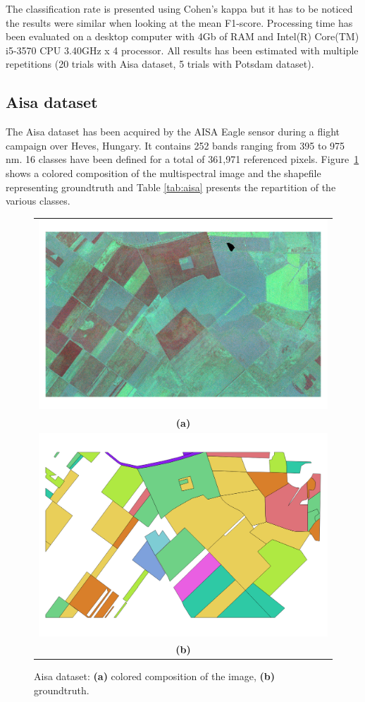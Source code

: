 \documentclass[journal,peerreview,onecolumn]{IEEEtran}
\begin{document}
    The classification rate is presented using Cohen's kappa but it has to be noticed the results were similar when looking at the mean F1-score. Processing time has been evaluated on a desktop computer with 4Gb of RAM and Intel(R) Core(TM) i5-3570 CPU \@ 3.40GHz x 4 processor. All results has been estimated with multiple repetitions (20 trials with Aisa dataset, 5 trials with Potsdam dataset).

    \subsection{Aisa dataset}
    \label{sec:aisa}
    The Aisa dataset has been acquired by the AISA Eagle sensor during a flight campaign over Heves, Hungary. It contains 252 bands ranging from 395 to 975 nm. 16 classes have been defined for a total of 361,971 referenced pixels. Figure~\ref{fig:aisa} shows a colored composition of the multispectral image and the shapefile representing groundtruth and Table \ref{tab:aisa} presents the repartition of the various classes.

    \begin{figure}[!t]
        \centering
        \begin{tabular}{c}
            \includegraphics[width=0.7\columnwidth]{Fig/aisa.png} \\
            {\bfseries{(a)}} \\
            \includegraphics[width=0.7\columnwidth]{Fig/aisa_gt.png} \\
            {\bfseries{(b)}} \\
        \end{tabular}
        \caption{Aisa dataset: {\bfseries{(a)}} colored composition of the image, {\bfseries{(b)}} groundtruth.\label{fig:aisa}}
    \end{figure}
\end{document}
